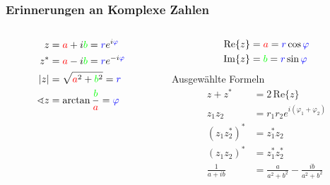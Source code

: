 
\begin{frame}
\frametitle{Erinnerungen an Komplexe Zahlen}
\begin{columns}
        \begin{column}[t]{.3\linewidth}
        
                \begin{align*}
                        z&={\color{red}a}+i{\color{green}b}={\color{blue}r}e^{i{\color{blue}\varphi}}\\
                        z^*&={\color{red}a}-i{\color{green}b}={\color{blue}r}e^{-i{\color{blue}\varphi}}\\
                        |z|&=\sqrt{{\color{red}a}^2+{\color{green}b}^2}={\color{blue}r}\\
                        \sphericalangle z &=\arctan\frac{\color{green}b}{\color{red}a}={\color{blue}\varphi}
                \end{align*}
        \end{column}
        \begin{column}[t]{.7\linewidth}
        \vspace{-3cm}
        \begin{align*}
         \mathrm{Re}\{z\}&={\color{red}a}  ={\color{blue}r}\cos{\color{blue}\varphi}\\
         \mathrm{Im}\{z\}&={\color{green}b}={\color{blue}r}\sin{\color{blue}\varphi}
        \end{align*}
        \hspace{2cm} Ausgewählte Formeln
         \begin{align*}
          z+z^*&=2\,\mathrm{Re}\{z\}\\
          z_1z_2&=r_1r_2 e^{i(\varphi_1+\varphi_2)}\\
          (z_1z_2^*)^*&=z_1^*z_2\\
          (z_1 z_2)^*&=z_1^*z_2^*\\
          \frac{1}{a+ib}&=\frac{a}{a^2+b^2}-\frac{ib}{a^2+b^2}
         \end{align*}
        \end{column}
\end{columns}
\end{frame}


